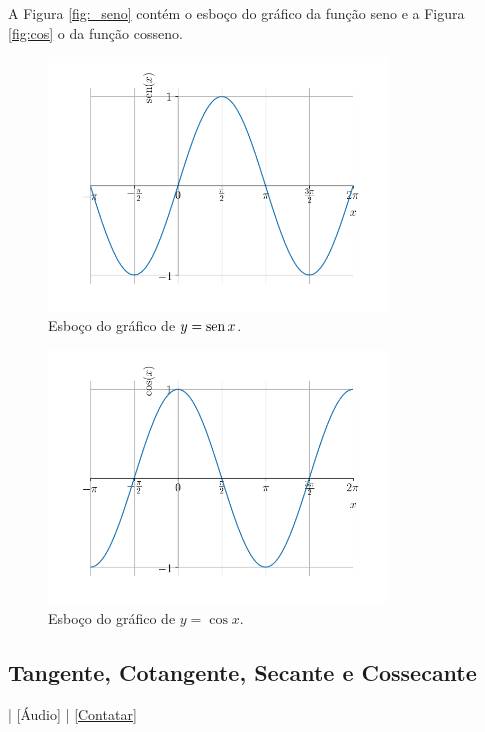 A Figura \ref{fig:_seno} contém o esboço do gráfico da função seno e a Figura \ref{fig:cos} o da função cosseno.

\begin{figure}[H]
  \centering
  \includegraphics[width=0.8\textwidth]{./cap_funcao/dados/fig_cos_seno_graficos/fig_seno_grafico}
  \caption{Esboço do gráfico de $y=\operatorname{sen} x$.}
\end{figure}

\begin{figure}[H]
  \centering
  \includegraphics[width=0.8\textwidth]{./cap_funcao/dados/fig_cos_seno_graficos/fig_cosseno_grafico}
  \caption{Esboço do gráfico de $y=\cos x$.}
\end{figure}


\subsection{Tangente, Cotangente, Secante e Cossecante}

\begin{flushright}
  [Vídeo] | [Áudio] | \href{https://phkonzen.github.io/notas/contato.html}{[Contatar]}
\end{flushright}

